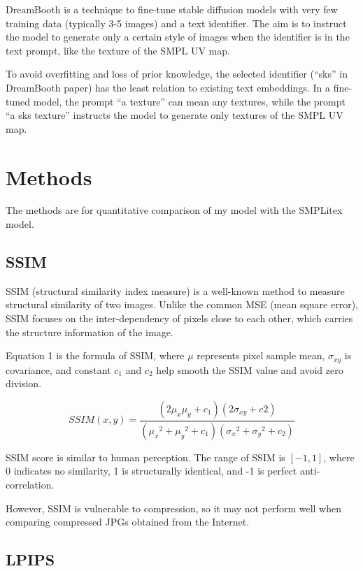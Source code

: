 \documentclass[acmtog]{acmart}
\begin{document}
DreamBooth \cite{ruiz2023dreambooth} is a technique to fine-tune stable diffusion models with very few training data (typically 3-5 images) and a text identifier. The aim is to instruct the model to generate only a certain style of images when the identifier is in the text prompt, like the texture of the SMPL UV map.

To avoid overfitting and loss of prior knowledge, the selected identifier (``sks'' in DreamBooth paper) has the least relation to existing text embeddings. In a fine-tuned model, the prompt ``a texture'' can mean any textures, while the prompt ``a sks texture'' instructs the model to generate only textures of the SMPL UV map.

\section{Methods}

The methods are for quantitative comparison of my model with the SMPLitex model.

\subsection{SSIM}

SSIM (structural similarity index measure) is a well-known method to measure structural similarity of two images. Unlike the common MSE (mean square error), SSIM focuses on the inter-dependency of pixels close to each other, which carries the structure information of the image.

Equation 1 is the formula of SSIM, where \(\mu\) represents pixel sample mean, \(\sigma_{xy}\) is covariance, and constant \(c_1\) and \(c_2\) help smooth the SSIM value and avoid zero division.

\begin{equation}
  SSIM(x,y)=\frac{(2\mu_x\mu_y+c_1)(2\sigma_{xy}+c2)}{({\mu_x}^2+{\mu_y}^2+c_1)({\sigma_x}^2+{\sigma_y}^2+c_2)}
\end{equation}

SSIM score is similar to human perception. The range of SSIM is \([-1,1]\), where 0 indicates no similarity, 1 is structurally identical, and -1 is perfect anti-correlation.

However, SSIM is vulnerable to compression, so it may not perform well when comparing compressed JPGs obtained from the Internet.

\subsection{LPIPS}
\end{document}
